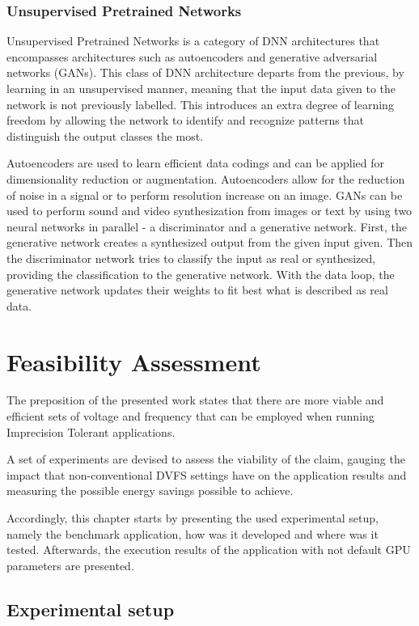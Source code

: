 \subsubsection{Unsupervised Pretrained Networks}


Unsupervised Pretrained Networks is a category of DNN architectures that encompasses architectures such as autoencoders and generative adversarial networks (GANs). This class of DNN architecture departs from the previous, by learning in an unsupervised manner, meaning that the input data given to the network is not previously labelled. This introduces an extra degree of learning freedom by allowing the network to identify and recognize patterns that distinguish the output classes the most.

Autoencoders are used to learn efficient data codings and can be applied for dimensionality reduction or augmentation. Autoencoders allow for the reduction of noise in a signal or to perform resolution increase on an image. GANs can be used to perform sound and video synthesization from images or text by using two neural networks in parallel - a discriminator and a generative network. First, the generative network creates a synthesized output from the given input given. Then the discriminator network tries to classify the input as real or synthesized, providing the classification to the generative network. With the data loop, the generative network updates their weights to fit best what is described as real data.



\section{Feasibility Assessment}
The preposition of the presented work states that there are more viable and efficient sets of voltage and frequency that can be employed when running Imprecision Tolerant applications. 

A set of experiments are devised to assess the viability of the claim, gauging the impact that non-conventional DVFS settings have on the application results and measuring the possible energy savings possible to achieve.

Accordingly, this chapter starts by presenting the used experimental setup, namely the benchmark application, how was it developed and where was it tested. Afterwards, the execution results of the application with not default GPU parameters are presented.


\subsection{Experimental setup}
\label{section:experimental_setup}

